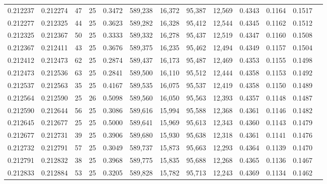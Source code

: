 \begin{tabular}{rrrrrrrrrrrrr}
0.212237 & 0.212274 &  47 &  25 &                                     0.3472 & 589,238 &  16,372 &  95,387 &  12,569 & 0.4343 & 0.1164 & 0.1517 \\
0.212277 & 0.212325 &  44 &  25 &                                     0.3623 & 589,282 &  16,328 &  95,412 &  12,544 & 0.4345 & 0.1162 & 0.1512 \\
0.212325 & 0.212367 &  50 &  25 &                                     0.3333 & 589,332 &  16,278 &  95,437 &  12,519 & 0.4347 & 0.1160 & 0.1508 \\
0.212367 & 0.212411 &  43 &  25 &                                     0.3676 & 589,375 &  16,235 &  95,462 &  12,494 & 0.4349 & 0.1157 & 0.1504 \\
0.212412 & 0.212473 &  62 &  25 &                                     0.2874 & 589,437 &  16,173 &  95,487 &  12,469 & 0.4353 & 0.1155 & 0.1498 \\
0.212473 & 0.212536 &  63 &  25 &                                     0.2841 & 589,500 &  16,110 &  95,512 &  12,444 & 0.4358 & 0.1153 & 0.1492 \\
0.212537 & 0.212563 &  35 &  25 &                                     0.4167 & 589,535 &  16,075 &  95,537 &  12,419 & 0.4358 & 0.1150 & 0.1489 \\
0.212564 & 0.212590 &  25 &  26 &                                     0.5098 & 589,560 &  16,050 &  95,563 &  12,393 & 0.4357 & 0.1148 & 0.1487 \\
0.212590 & 0.212644 &  56 &  25 &                                     0.3086 & 589,616 &  15,994 &  95,588 &  12,368 & 0.4361 & 0.1146 & 0.1482 \\
0.212645 & 0.212677 &  25 &  25 &                                     0.5000 & 589,641 &  15,969 &  95,613 &  12,343 & 0.4360 & 0.1143 & 0.1479 \\
0.212677 & 0.212731 &  39 &  25 &                                     0.3906 & 589,680 &  15,930 &  95,638 &  12,318 & 0.4361 & 0.1141 & 0.1476 \\
0.212732 & 0.212791 &  57 &  25 &                                     0.3049 & 589,737 &  15,873 &  95,663 &  12,293 & 0.4364 & 0.1139 & 0.1470 \\
0.212791 & 0.212832 &  38 &  25 &                                     0.3968 & 589,775 &  15,835 &  95,688 &  12,268 & 0.4365 & 0.1136 & 0.1467 \\
0.212833 & 0.212884 &  53 &  25 &                                     0.3205 & 589,828 &  15,782 &  95,713 &  12,243 & 0.4369 & 0.1134 & 0.1462 \\

\end{tabular}
